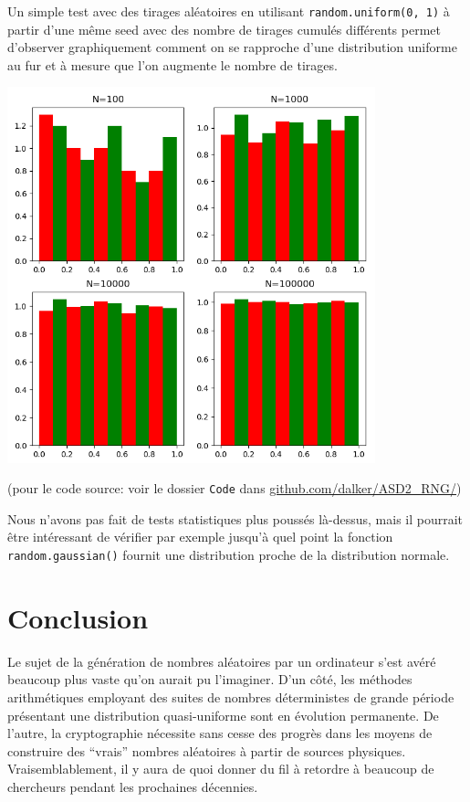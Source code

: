 \documentclass{scrartcl}
\begin{document}
Un simple test avec des tirages aléatoires en utilisant
\texttt{random.uniform(0, 1)} à partir d'une même seed avec des nombre de
tirages cumulés différents permet d'observer graphiquement comment on se
rapproche d'une distribution uniforme au fur et à mesure que l'on augmente le
nombre de tirages.
\begin{center}
  \includegraphics[width=0.8\textwidth]{img/uniformes.png}\par
  (pour le code source: voir le dossier \texttt{Code} dans
  \url{github.com/dalker/ASD2_RNG/})
\end{center}
Nous n'avons pas fait de tests statistiques plus poussés là-dessus, mais il
pourrait être intéressant de vérifier par exemple jusqu'à quel point la fonction
\texttt{random.gaussian()} fournit une distribution proche de la distribution
normale.

\section{Conclusion}
Le sujet de la génération de nombres aléatoires par un ordinateur s'est avéré
beaucoup plus vaste qu'on aurait pu l'imaginer. D'un côté, les méthodes
arithmétiques employant des suites de nombres déterministes de grande période
présentant une distribution quasi-uniforme sont en évolution permanente. De
l'autre, la cryptographie nécessite sans cesse des progrès dans les moyens de
construire des ``vrais'' nombres aléatoires à partir de sources
physiques. Vraisemblablement, il y aura de quoi donner du fil à retordre à
beaucoup de chercheurs pendant les prochaines décennies.

\printbibliography
\end{document}
